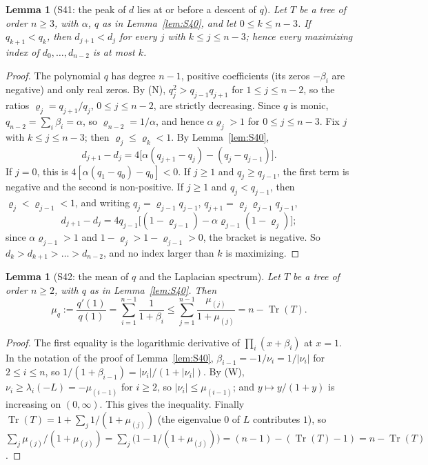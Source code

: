 \documentclass[11pt]{amsart}
\newtheorem{lemma}[theorem]{Lemma}
\theoremstyle{definition}
\theoremstyle{remark}
\newcommand{\Tr}{\operatorname{Tr}}
\begin{document}
\begin{lemma}[S41: the peak of $d$ lies at or before a descent of $q$]\label{lem:S41}
Let $T$ be a tree of order $n\ge3$, with $\alpha$, $q$ as in
Lemma~\ref{lem:S40}, and let $0\le k\le n-3$. If $q_{k+1}<q_k$, then
$d_{j+1}<d_j$ for every $j$ with $k\le j\le n-3$; hence every maximizing
index of $d_0,\dots,d_{n-2}$ is at most $k$.
\end{lemma}

\begin{proof}
The polynomial $q$ has degree $n-1$, positive coefficients (its zeros
$-\beta_i$ are negative) and only real zeros. By (N),
$q_j^2>q_{j-1}q_{j+1}$ for $1\le j\le n-2$, so the ratios
$\varrho_j=q_{j+1}/q_j$, $0\le j\le n-2$, are strictly decreasing. Since $q$
is monic, $q_{n-2}=\sum_i\beta_i=\alpha$, so $\varrho_{n-2}=1/\alpha$, and
hence $\alpha\varrho_j>1$ for $0\le j\le n-3$. Fix $j$ with $k\le j\le n-3$;
then $\varrho_j\le\varrho_k<1$. By Lemma~\ref{lem:S40},
\[
d_{j+1}-d_j=4\bigl[\alpha(q_{j+1}-q_j)-(q_j-q_{j-1})\bigr].
\]
If $j=0$, this is $4[\alpha(q_1-q_0)-q_0]<0$. If $j\ge1$ and
$q_j\ge q_{j-1}$, the first term is negative and the second is non-positive.
If $j\ge1$ and $q_j<q_{j-1}$, then $\varrho_j<\varrho_{j-1}<1$, and writing
$q_j=\varrho_{j-1}q_{j-1}$, $q_{j+1}=\varrho_j\varrho_{j-1}q_{j-1}$,
\[
d_{j+1}-d_j=4q_{j-1}\bigl[(1-\varrho_{j-1})-\alpha\varrho_{j-1}(1-\varrho_j)\bigr];
\]
since $\alpha\varrho_{j-1}>1$ and $1-\varrho_j>1-\varrho_{j-1}>0$, the bracket
is negative. So $d_k>d_{k+1}>\dots>d_{n-2}$, and no index larger than $k$ is
maximizing.
\end{proof}

\begin{lemma}[S42: the mean of $q$ and the Laplacian spectrum]\label{lem:S42}
Let $T$ be a tree of order $n\ge2$, with $q$ as in Lemma~\ref{lem:S40}. Then
\[
\mu_q:=\frac{q'(1)}{q(1)}=\sum_{i=1}^{n-1}\frac1{1+\beta_i}
\le\sum_{j=1}^{n-1}\frac{\mu_{(j)}}{1+\mu_{(j)}}=n-\Tr(T).
\]
\end{lemma}

\begin{proof}
The first equality is the logarithmic derivative of $\prod_i(x+\beta_i)$ at
$x=1$. In the notation of the proof of Lemma~\ref{lem:S40},
$\beta_{i-1}=-1/\nu_i=1/|\nu_i|$ for $2\le i\le n$, so
$1/(1+\beta_{i-1})=|\nu_i|/(1+|\nu_i|)$. By (W), $\nu_i\ge\lambda_i(-L)=-\mu_{(i-1)}$
for $i\ge2$, so $|\nu_i|\le\mu_{(i-1)}$; and $y\mapsto y/(1+y)$ is increasing
on $(0,\infty)$. This gives the inequality. Finally
$\Tr(T)=1+\sum_j1/(1+\mu_{(j)})$ (the eigenvalue $0$ of $L$ contributes $1$),
so $\sum_j\mu_{(j)}/(1+\mu_{(j)})=\sum_j\bigl(1-1/(1+\mu_{(j)})\bigr)=(n-1)-(\Tr(T)-1)=n-\Tr(T)$.
\end{proof}
\end{document}

